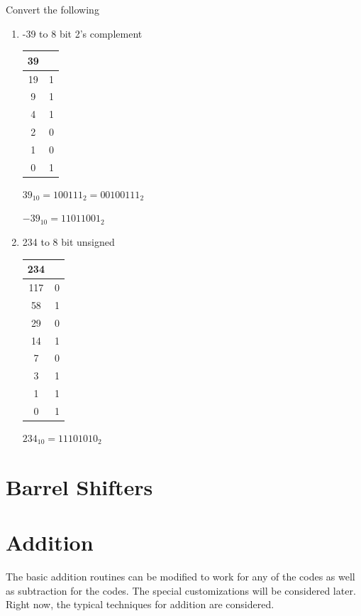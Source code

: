 \begin{example}

Convert the following
    \begin{enumerate}
        \item -39 to 8 bit 2's complement

    {\color{ans}
    \begin{tabular}{c|c}
      39 &  \\ \hline
      19 & 1 \\
       9 & 1 \\
       4 & 1 \\
       2 & 0 \\
       1 & 0 \\
       0 & 1 \\
    \end{tabular}

    $39_{10}=100111_2=00100111_2$

    $-39_{10}=11011001_2$
    }
        \item 234 to 8 bit unsigned

    {\color{ans}
    \begin{tabular}{c|c}
      234 &  \\ \hline
      117 & 0 \\
       58 & 1 \\
       29 & 0 \\
       14 & 1 \\
        7 & 0 \\
        3 & 1 \\
        1 & 1 \\
        0 & 1 \\
    \end{tabular}

    $234_{10}=11101010_2$
    }
\end{enumerate}
\end{example}

\section{Barrel Shifters}

\section{Addition}

The basic addition routines can be modified to work for any of the codes as well as subtraction for the codes.  The special customizations will be considered later.  Right now, the typical techniques for addition are considered.

